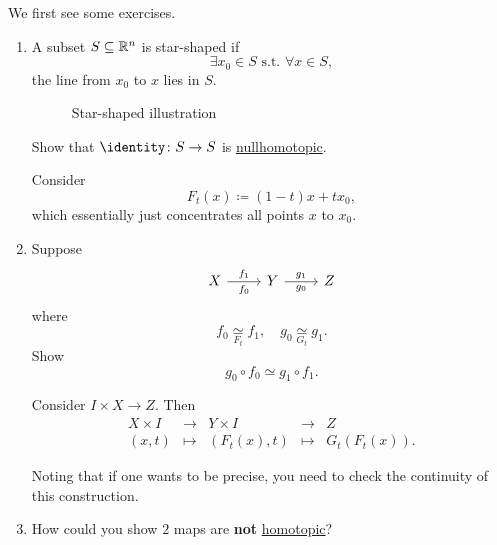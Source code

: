 \begin{exercise}
	We first see some exercises.
	\begin{enumerate}
		\item A subset \(S\subseteq \mathbb{\MakeUppercase{R}} ^n\) is star-shaped if
		      \[
			      \exists x_0\in S \text{ s.t. }\forall x\in S,
		      \]
		      the line from \(x_0\) to \(x\) lies in \(S\).
		      \begin{figure}[H]
			      \centering
			      \caption{Star-shaped illustration}
			      \label{fig:eg:star-shaped}
		      \end{figure}
		      Show that \(\identity\colon S\to S\) is \hyperref[def:nullhomotopic]{nullhomotopic}.

		      \begin{answer}
			      Consider
			      \[
				      F_{t}(x) \coloneqq (1 - t)x+tx_0,
			      \]
			      which essentially just concentrates all points \(x\) to \(x_0\).
		      \end{answer}
		\item Suppose
		      \[
			      \begin{tikzcd}
				      X \ar[r,"f_1", "f_0"'] & Y \ar[r,"g_1", "g_0"'] & Z
			      \end{tikzcd}
		      \]
		      where
		      \[
			      f_0 \underset{F_{t}}{\simeq} f_1,\quad g_0\underset{G_{t}}{\simeq} g_1.
		      \]
		      Show
		      \[
			      g_0\circ f_0\simeq g_{1}\circ f_1.
		      \]
		      \begin{answer}
			      Consider \(I\times X\to Z\). Then
			      \[
				      \begin{array}{ccccc}
					      X \times I & \to     & Y \times I  & \to     & Z                \\
					      (x, t)     & \mapsto & (F_t(x), t) & \mapsto & G_{t}(F_{t}(x)).
				      \end{array}
			      \]
		      \end{answer}
		      \begin{remark}
			      Noting that if one wants to be precise, you need to check the continuity of this construction.
		      \end{remark}
		\item How could you show \(2\) maps are \textbf{not} \hyperref[def:homotopic]{homotopic}?
		      \begin{answer}

		      \end{answer}
	\end{enumerate}
\end{exercise}